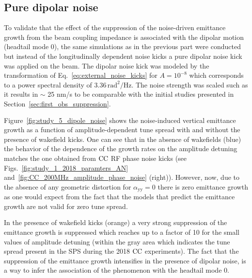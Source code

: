 

\subsection{Pure dipolar noise}\label{subsec:dipole_noise}
To validate that the effect of the suppression of the noise-driven emittance growth from the beam coupling impedance is associated with the dipolar motion (headtail mode 0), the same simulations as in the previous part were conducted but instead of the longitudinally dependent noise kicks a pure dipolar noise kick was applied on the beam. The dipolar noise kick was modeled by the transformation of Eq.~\eqref{eq:external_noise_kicks} for $A=10^{-8}$ which corresponds to a power spectral density of 3.36\,$\mathrm{rad^2/Hz}$. The noise strength was scaled such as it results in $\sim$ 25 nm/s to be comparable with the initial studies presented in Section~\ref{sec:first_obs_suppression}.

Figure~\ref{fig:study_5_dipole_noise} shows the noise-induced vertical emittance growth as a function of amplitude-dependent tune spread with and without the presence of wakefield kicks. One can see that in the absence of wakefields (blue) the behavior of the dependence of the growth rates on the amplitude detuning matches the one obtained from ${\mathrm{CC}}$ RF phase noise kicks (see Figs.~\ref{fig:study_1_2018_paramters_AN} and~\ref{fig:CC_200MHz_amplitude_phase_noise} (right)). However, now, due to the absence of any geometric distortion for $\alpha_\mathrm{yy}=0$ there is zero emittance growth as one would expect from the fact that the models that predict the emittance growth are not valid for zero tune spread.

In the presence of wakefield kicks (orange) a very strong suppression of the emittance growth is suppressed which reaches up to a factor of 10 for the small values of amplitude detuning (within the gray area which indicates the tune spread present in the SPS during the 2018 ${\mathrm{CC}}$ experiments). The fact that the suppression of the emittance growth intensifies in the presence of dipolar noise, is a way to infer the association of the phenomenon with the headtail mode 0.

